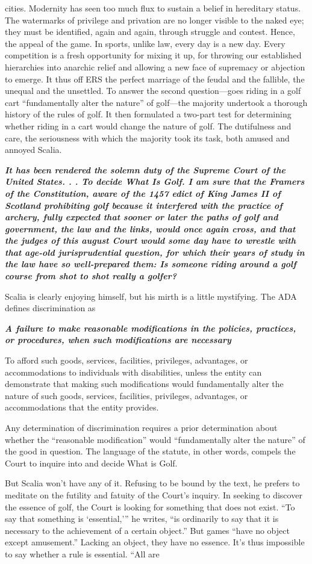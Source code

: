 cities. Modernity has seen too much flux to sustain a belief in hereditary status. The watermarks of privilege and privation are no longer visible to the naked eye; they must be identified, again and again, through struggle and contest. Hence, the appeal of the game. In sports, unlike law, every day is a new day. Every competition is a fresh opportunity for mixing it up, for throwing our established hierarchies into anarchic relief and allowing a new face of supremacy or abjection to emerge. It thus off ERS the perfect marriage of the feudal and the fallible, the unequal and the unsettled. To answer the second question—goes riding in a golf cart “fundamentally alter the nature” of golf—the majority undertook a thorough history of the rules of golf. It then formulated a two-part test for determining whether riding in a cart would change the nature of golf. The dutifulness and care, the seriousness with which the majority took its task, both amused and annoyed Scalia.{\par} {\textbf{\textit{It has been rendered the solemn duty of the Supreme Court of the United States. . . To decide What Is Golf. I am sure that the Framers of the Constitution, aware of the 1457 edict of King James II of Scotland prohibiting golf because it interfered with the practice of archery, fully expected that sooner or later the paths of golf and government, the law and the links, would once again cross, and that the judges of this august Court would some day have to wrestle with that age-old jurisprudential question, for which their years of study in the law have so well-prepared them: Is someone riding around a golf course from shot to shot really a golfer?} } }{\par} Scalia is clearly enjoying himself, but his mirth is a little mystifying. The ADA defines discrimination as{\par} {\textbf{\textit{A failure to make reasonable modifications in the policies, practices, or procedures, when such modifications are necessary} } }{\par} To afford such goods, services, facilities, privileges, advantages, or accommodations to individuals with disabilities, unless the entity can demonstrate that making such modifications would fundamentally alter the nature of such goods, services, facilities, privileges, advantages, or accommodations that the entity provides.{\par} Any determination of discrimination requires a prior determination about whether the “reasonable modification” would “fundamentally alter the nature” of the good in question. The language of the statute, in other words, compels the Court to inquire into and decide What is Golf.{\par} But Scalia won’t have any of it. Refusing to be bound by the text, he prefers to meditate on the futility and fatuity of the Court’s inquiry. In seeking to discover the essence of golf, the Court is looking for something that does not exist. “To say that something is ‘essential,’” he writes, “is ordinarily to say that it is necessary to the achievement of a certain object.” But games “have no object except amusement.” Lacking an object, they have no essence. It’s thus impossible to say whether a rule is essential. “All are 